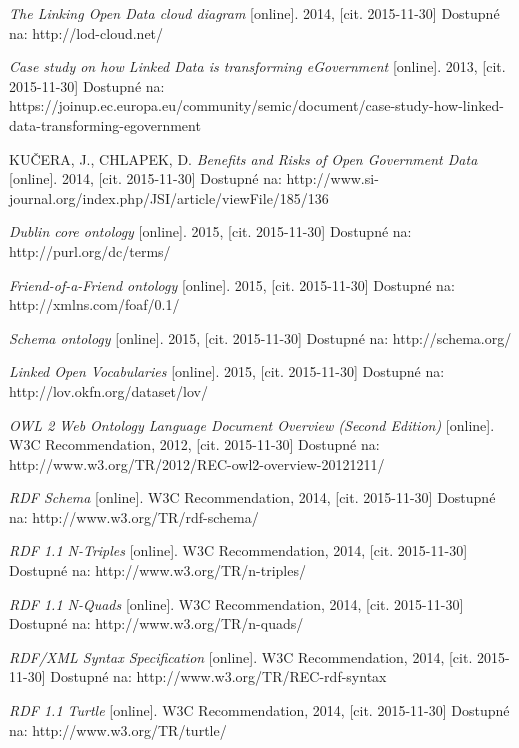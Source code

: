 \begin{thebibliography}{99}
  \emph{The Linking Open Data cloud diagram} 
  [online]. 2014, [cit. 2015-11-30] Dostupné na: 
  http://lod-cloud.net/
   
  \emph{Case study on how Linked Data is transforming eGovernment} 
  [online]. 2013, [cit. 2015-11-30] Dostupné na: 
  https://joinup.ec.europa.eu/community/semic/document/case-study-how-linked-data-transforming-egovernment
  
  KUČERA, J., CHLAPEK, D.
  \emph{Benefits and Risks of Open Government Data} 
  [online]. 2014, [cit. 2015-11-30] Dostupné na: 
  http://www.si-journal.org/index.php/JSI/article/viewFile/185/136 
  
  \emph{Dublin core ontology} 
  [online]. 2015, [cit. 2015-11-30] Dostupné na: 
  http://purl.org/dc/terms/
  
  \emph{Friend-of-a-Friend ontology} 
  [online]. 2015, [cit. 2015-11-30] Dostupné na: 
  http://xmlns.com/foaf/0.1/
  
  \emph{Schema ontology} 
  [online]. 2015, [cit. 2015-11-30] Dostupné na: 
  http://schema.org/  
  
  \emph{Linked Open Vocabularies } 
  [online]. 2015, [cit. 2015-11-30] Dostupné na: 
  http://lov.okfn.org/dataset/lov/
  
  \emph{OWL 2 Web Ontology Language Document Overview (Second Edition)} 
  [online]. W3C Recommendation, 2012, [cit. 2015-11-30] Dostupné na: 
  http://www.w3.org/TR/2012/REC-owl2-overview-20121211/ 
  
  \emph{RDF Schema} 
  [online]. W3C Recommendation, 2014, [cit. 2015-11-30] Dostupné na: 
  http://www.w3.org/TR/rdf-schema/   
  
  \emph{RDF 1.1 N-Triples} 
  [online]. W3C Recommendation, 2014, [cit. 2015-11-30] Dostupné na: 
  http://www.w3.org/TR/n-triples/ 
  
  \emph{RDF 1.1 N-Quads} 
  [online]. W3C Recommendation, 2014, [cit. 2015-11-30] Dostupné na: 
  http://www.w3.org/TR/n-quads/ 

  \emph{RDF/XML Syntax Specification} 
  [online]. W3C Recommendation, 2014, [cit. 2015-11-30] Dostupné na: 
  http://www.w3.org/TR/REC-rdf-syntax 
  
  \emph{RDF 1.1 Turtle} 
  [online]. W3C Recommendation, 2014, [cit. 2015-11-30] Dostupné na: 
  http://www.w3.org/TR/turtle/


\end{thebibliography}
